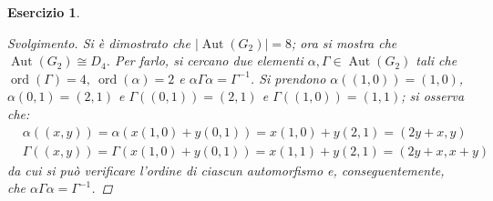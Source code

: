 \documentclass[12pt]{scrartcl}
\theoremstyle{style}
\newtheorem{esercizio}{Esercizio}[section]
\newenvironment{svolgimento}{\renewcommand\qedsymbol{$\blacksquare$}\begin{proof}[Svolgimento]}{\end{proof}}
\numberwithin{equation}{subsection}
\begin{document}
\begin{esercizio}
\begin{svolgimento}
	Si \`e dimostrato che $|\operatorname{Aut} (G_2)| = 8$; ora si mostra che $\operatorname{Aut} (G_2) \cong D_4$.
	Per farlo, si cercano due elementi $\alpha , \Gamma \in \operatorname{Aut} (G_2)$ tali che $\operatorname{ord}(\Gamma) = 4, \ \operatorname{ord}(\alpha ) = 2$ e $\alpha \Gamma \alpha = \Gamma^{-1}$.
	Si prendono $\alpha ((1,0))= (1,0)$, $\alpha (0,1) = (2,1)$ e $\Gamma((0,1)) = (2,1)$ e $\Gamma((1,0)) = (1,1)$; si osserva che:
	\[
	\begin{split}
		&\alpha ((x,y)) = \alpha (x(1,0)+y(0,1)) = x(1,0) + y (2,1) =(2y+x,y)\\
		& \Gamma((x,y)) = \Gamma (x(1,0) + y (0,1)) = x (1,1) + y(2,1) = (2y+x,x+y)
	\end{split}
	\] 
	da cui si pu\`o verificare l'ordine di ciascun automorfismo e, conseguentemente, che $\alpha \Gamma\alpha = \Gamma^{-1}$.
\end{svolgimento}
\end{esercizio}
\end{document}

